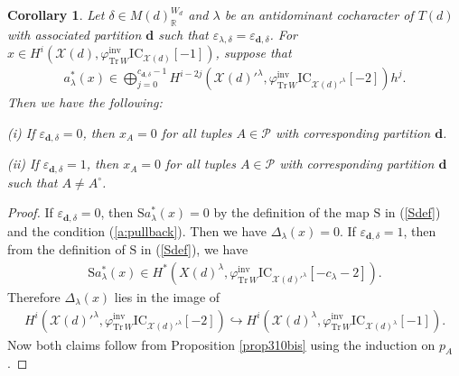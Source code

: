 \documentclass [11pt,oneside,a4paper,mathscr]{amsart}
\newtheorem{cor}[thm]{Corollary}
\theoremstyle{definition}
\newcommand{\X}{\mathscr{X}}
\begin{document}
\begin{cor}\label{onesupport2}
Let $\delta\in M(d)_\mathbb{R}^{W_d}$
and $\lambda$ be an antidominant cocharacter of $T(d)$ with associated partition $\mathbf{d}$ such that $\varepsilon_{\lambda,\delta}=\varepsilon_{\mathbf{d},\delta}$.
For $x\in H^i(\X(d), \varphi^{\mathrm{inv}}_{\mathrm{Tr}\,W}\mathrm{IC}_{\X(d)}[-1])$, suppose that
\begin{align}\label{a:pullback}a^*_\lambda(x)\in \bigoplus_{j=0}^{c_{\mathbf{d}, \delta}-1}H^{i-2j}(\X(d)'^\lambda, \varphi^{\mathrm{inv}}_{\mathrm{Tr}\,W}\mathrm{IC}_{\X(d)'^\lambda}[-2])h^j.
\end{align}
Then we have the following: 

(i) If $\varepsilon_{\mathbf{d}, \delta}=0$, then $x_A=0$ for all tuples $A\in\mathscr{P}$ with corresponding partition 
$\mathbf{d}$. 

(ii) If $\varepsilon_{\mathbf{d}, \delta}=1$, then $x_A=0$ for all tuples $A\in\mathscr{P}$ with corresponding partition 
$\mathbf{d}$ such that $A \neq A^\circ$.
\end{cor}

\begin{proof}
If $\varepsilon_{\mathbf{d}, \delta}=0$, 
then $\mathrm{S}a_{\lambda}^{\ast}(x)=0$
by the definition of the map $\mathrm{S}$ in (\ref{Sdef})
and the condition (\ref{a:pullback}). 
Then we have $\Delta_{\lambda}(x)=0$. 
If $\varepsilon_{\mathbf{d}, \delta}=1$, 
then from the definition of $\mathrm{S}$ in (\ref{Sdef}), 
we have 
\begin{align*}
\mathrm{S}a_\lambda^*(x)\in H^{\ast}\left(X(d)^\lambda, \varphi_{\mathrm{Tr}\,W}^{\mathrm{inv}}\mathrm{IC}_{\X(d)'^\lambda}[-c_\lambda-2]\right). 
\end{align*}
Therefore 
$\Delta_\lambda(x)$ lies in the image of 
\begin{align*}
H^i(\X(d)'^\lambda, \varphi^{\mathrm{inv}}_{\mathrm{Tr}\,W}\mathrm{IC}_{\X(d)'^\lambda}[-2])\hookrightarrow  H^i(\X(d)^\lambda, \varphi^{\mathrm{inv}}_{\mathrm{Tr}\,W}\mathrm{IC}_{\X(d)^\lambda}[-1]).\end{align*}
Now both claims follow from Proposition \ref{prop310bis}
using the induction on $p_A$. 
\end{proof}

\end{document}
